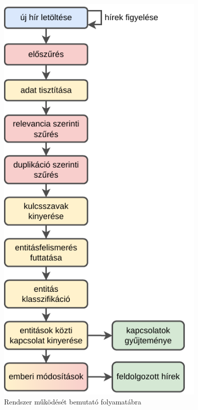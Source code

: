 \begin{figure}[H]
	\centering
	\includegraphics[width=100mm,keepaspectratio]{figures/flowchart.pdf}
	\caption{Rendszer működését bemutató folyamatábra}
\end{figure}
